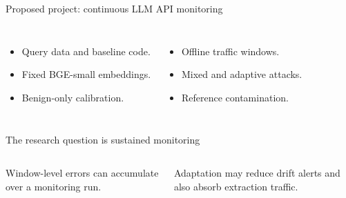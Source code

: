 \begin{frame}[t]{Proposed project: continuous LLM API monitoring}
\vspace{0.1cm}

\par\vspace{0.25cm}
\begin{columns}[T,onlytextwidth]
\begin{itemize}\setlength\itemsep{0.3em}
\item Query data and baseline code.
\item Fixed BGE-small embeddings.
\item Benign-only calibration.
\end{itemize}
\begin{itemize}\setlength\itemsep{0.3em}
\item Offline traffic windows.
\item Mixed and adaptive attacks.
\item Reference contamination.
\end{itemize}
\end{columns}
\end{frame}

\begin{frame}[t]{The research question is sustained monitoring}
\vspace{0.15cm}
\vspace{-0.15cm}

\par\vspace{-0.1cm}
\begin{columns}[T,onlytextwidth]
\par
{\small Window-level errors can accumulate over a monitoring run.\par}
\par
{\small Adaptation may reduce drift alerts and also absorb extraction traffic.\par}
\end{columns}
\end{frame}

